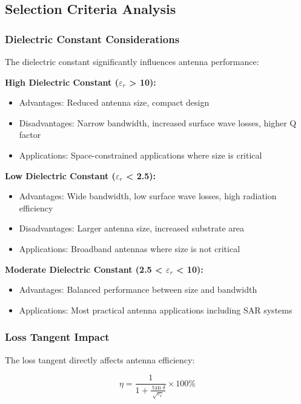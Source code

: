 \documentclass[12pt]{article}
\begin{document}
\subsection{Selection Criteria Analysis}

\subsubsection{Dielectric Constant Considerations}

The dielectric constant significantly influences antenna performance:

\textbf{High Dielectric Constant ($\varepsilon_r$ > 10):}
\begin{itemize}
    \item Advantages: Reduced antenna size, compact design
    \item Disadvantages: Narrow bandwidth, increased surface wave losses, higher Q factor
    \item Applications: Space-constrained applications where size is critical
\end{itemize}

\textbf{Low Dielectric Constant ($\varepsilon_r$ < 2.5):}
\begin{itemize}
    \item Advantages: Wide bandwidth, low surface wave losses, high radiation efficiency
    \item Disadvantages: Larger antenna size, increased substrate area
    \item Applications: Broadband antennas where size is not critical
\end{itemize}

\textbf{Moderate Dielectric Constant (2.5 < $\varepsilon_r$ < 10):}
\begin{itemize}
    \item Advantages: Balanced performance between size and bandwidth
    \item Applications: Most practical antenna applications including SAR systems
\end{itemize}

\subsubsection{Loss Tangent Impact}

The loss tangent directly affects antenna efficiency:

\[\eta = \frac{1}{1 + \frac{\tan\delta}{\sqrt{\varepsilon_r}}} \times 100\%\]
\end{document}
